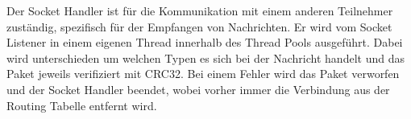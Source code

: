 Der Socket Handler ist für die Kommunikation mit einem anderen Teilnehmer zuständig, spezifisch für der Empfangen von Nachrichten.
Er wird vom Socket Listener in einem eigenen Thread innerhalb des Thread Pools ausgeführt. 
Dabei wird unterschieden um welchen Typen es sich bei der Nachricht handelt und das Paket jeweils verifiziert mit CRC32.
Bei einem Fehler wird das Paket verworfen und der Socket Handler beendet,
 wobei vorher immer die Verbindung aus der Routing Tabelle entfernt wird.